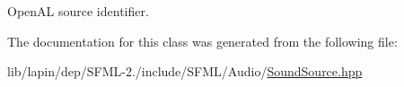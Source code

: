 Open\-A\-L source identifier. 



The documentation for this class was generated from the following file\-:\begin{DoxyCompactItemize}
\item 
lib/lapin/dep/\-S\-F\-M\-L-\/2./include/\-S\-F\-M\-L/\-Audio/\hyperlink{lapin_2dep_2_s_f_m_l-2_83_2include_2_s_f_m_l_2_audio_2_sound_source_8hpp}{Sound\-Source.\-hpp}\end{DoxyCompactItemize}

